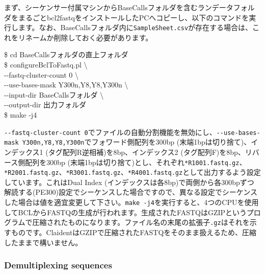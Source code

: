 \documentclass[titlepage,10pt,a4paper,english]{jsbook}
\newenvironment{cmd}{\begin{oframed}\raggedright\ttfamily\footnotesize\setlength{\baselineskip}{1.4em}}{\end{oframed}\vspace{-1em}}
\begin{document}
まず、シーケンサー付属マシンからBaseCallsフォルダを含むランデータフォルダをまるごとbcl2fastqをインストールしたPCへコピーし、以下のコマンドを実行します。なお、BaseCallsフォルダ内に\texttt{SampleSheet.csv}が存在する場合は、これをリネームか削除しておく必要があります。
\begin{cmd}
\$ cd BaseCallsフォルダの直上フォルダ\\
\$ configureBclToFastq.pl {\textbackslash}\\
{-}{-}fastq-cluster-count 0 {\textbackslash}\\
{-}{-}use-bases-mask Y300n,Y8,Y8,Y300n {\textbackslash}\\
{-}{-}input-dir BaseCallsフォルダ {\textbackslash}\\
{-}{-}output-dir 出力フォルダ\\
\$ make -j4
\end{cmd}
\texttt{{-}{-}fastq-cluster-count 0}でファイルの自動分割機能を無効にし、\texttt{{-}{-}use-bases-mask Y300n,Y8,Y8,Y300n}でフォワード側配列を300bp (末端1bpは切り捨て)、インデックス1 (タグ配列R逆相補)を8bp、インデックス2 (タグ配列F)を8bp、リバース側配列を300bp (末端1bpは切り捨て)とし、それぞれ\texttt{*{\textunderscore}R1{\textunderscore}001.fastq.gz}、\texttt{*{\textunderscore}R2{\textunderscore}001.fastq.gz}、\texttt{*{\textunderscore}R3{\textunderscore}001.fastq.gz}、\texttt{*{\textunderscore}R4{\textunderscore}001.fastq.gz}として出力するよう設定しています。これはDual Index (インデックスは各8bp)で両側から各300bpずつ解読する(PE300)設定でシーケンスした場合ですので、異なる設定でシーケンスした場合は値を適宜変更して下さい。\texttt{make -j4}を実行すると、4つのCPUを使用してBCLからFASTQの生成が行われます。生成されたFASTQはGZIPというプログラムで圧縮されたものになります。ファイル名の末尾の拡張子\texttt{.gz}はそれを示すものです。ClaidentはGZIPで圧縮されたFASTQをそのまま扱えるため、圧縮したままで構いません。

\subsubsection{Demultiplexing sequences}
\end{document}
